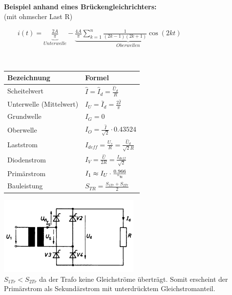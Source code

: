 	\begin{minipage}[c]{8cm} 
	   \textbf{Beispiel anhand eines Brückengleichrichters:}	  	\\
	   (mit ohmscher Last R)
	\end{minipage}   
	\begin{minipage}[c]{10cm} 	
	   $ \qquad i(t) = \underbrace{\frac{2A}{\pi}}_{Unterwelle} - \underbrace{\frac{4A}{\pi} \sum\limits_{k=1}^n \frac{1}{(2k-1)(2k+1)} \cos(2kt)}_{Oberwellen} $
	\end{minipage}\\
\begin{minipage}[c]{10cm}  
		\begin{tabular}{| l | l |}
    		\hline 
      		\textbf{Bezeichnung}
      		& \textbf{Formel} \\
      		\hline
      		Scheitelwert 
      		& $\hat{I} = \hat{I}_d = \frac{\hat{U}_d}{R} $ \\
      		Unterwelle (Mittelwert)
      		& $I_U = \bar{I}_d = \frac{2 \hat{I}}{\pi}$ \\
      		Grundwelle
      		& $I_G = 0$ \\
      		Oberwelle
      		& $I_O = \frac{\hat{I}}{\sqrt{2}} \cdot 0.43524$ \\
      		Laststrom
      		& $I_{d eff} =  \frac{U_s}{R}= \frac{\hat{U}_d}{\sqrt{2}R}$ \\ 
      		Diodenstrom
      		& $I_{V} = \frac{\hat{U}}{2 R} = \frac{I_{d eff}}{\sqrt{2}}$ \\
      		Prim\"arstrom
      		& $I_1 \approx I_U \cdot \frac{0.966}{"u}$ \\
      		Bauleistung 
      		& $S_{TR} = \frac{S_{1Tr} + S_{2Tr}}{2}$ \\
      		\hline
    	\end{tabular}
	\end{minipage}   
	\begin{minipage}[c]{8cm}  
			\includegraphics[width=7cm]{bilder/brueckengleichrichter.png}  \\			
	$S_{1Tr} < S_{2Tr}$ da der Trafo keine Gleichstr\"ome übertr\"agt. Somit erscheint der Prim\"arstrom
	als Sekund\"arstrom mit unterdrücktem Gleichstromanteil.			
	\end{minipage}
